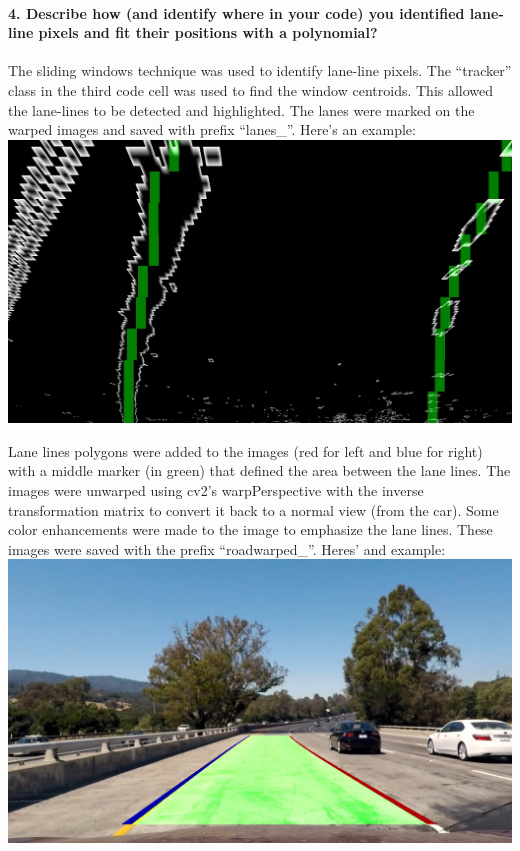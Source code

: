 \documentclass[11pt]{article}
\makeatletter
\def\maxwidth{\ifdim\Gin@nat@width>\linewidth\linewidth
    \else\Gin@nat@width\fi}
\let\Oldincludegraphics\includegraphics
\renewcommand{\includegraphics}[1]{\Oldincludegraphics[width=.8\maxwidth]{#1}}
\makeatother
\begin{document}
\hypertarget{describe-how-and-identify-where-in-your-code-you-identified-lane-line-pixels-and-fit-their-positions-with-a-polynomial}{%
\paragraph{4. Describe how (and identify where in your code) you
identified lane-line pixels and fit their positions with a
polynomial?}\label{describe-how-and-identify-where-in-your-code-you-identified-lane-line-pixels-and-fit-their-positions-with-a-polynomial}}

The sliding windows technique was used to identify lane-line pixels. The
``tracker'' class in the third code cell was used to find the window
centroids. This allowed the lane-lines to be detected and highlighted.
The lanes were marked on the warped images and saved with prefix
``lanes\_''. Here's an example:
\includegraphics{./output_images/lanes_test1.jpg}

Lane lines polygons were added to the images (red for left and blue for
right) with a middle marker (in green) that defined the area between the
lane lines. The images were unwarped using cv2's warpPerspective with
the inverse transformation matrix to convert it back to a normal view
(from the car). Some color enhancements were made to the image to
emphasize the lane lines. These images were saved with the prefix
``roadwarped\_''. Heres' and example:
\includegraphics{./output_images/roadwarped_test1.jpg}
\end{document}
